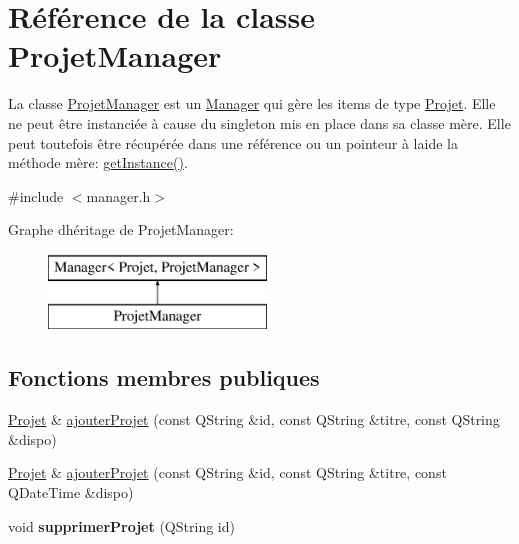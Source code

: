 \hypertarget{class_projet_manager}{}\section{Référence de la classe Projet\+Manager}
\label{class_projet_manager}


La classe \hyperlink{class_projet_manager}{Projet\+Manager} est un \hyperlink{class_manager}{Manager} qui gère les items de type \hyperlink{class_projet}{Projet}. Elle ne peut être instanciée à cause du singleton mis en place dans sa classe mère. Elle peut toutefois être récupérée dans une référence ou un pointeur à l\textquotesingle{}aide la méthode mère\+: \hyperlink{class_manager_a8372e4f1e14f3605a57d839b152325ed}{get\+Instance()}.  




{\ttfamily \#include $<$manager.\+h$>$}

Graphe d\textquotesingle{}héritage de Projet\+Manager\+:\begin{figure}[H]
\begin{center}
\leavevmode
\includegraphics[height=2.000000cm]{class_projet_manager}
\end{center}
\end{figure}
\subsection*{Fonctions membres publiques}
\begin{DoxyCompactItemize}
\item 
\hyperlink{class_projet}{Projet} \& \hyperlink{class_projet_manager_a3394d5ab0749ea68efb5ae535b27e6fc}{ajouter\+Projet} (const Q\+String \&id, const Q\+String \&titre, const Q\+String \&dispo)
\item 
\hyperlink{class_projet}{Projet} \& \hyperlink{class_projet_manager_a6da5a61e20cbf0a6bc98a3681f977829}{ajouter\+Projet} (const Q\+String \&id, const Q\+String \&titre, const Q\+Date\+Time \&dispo)
\item 
\hypertarget{class_projet_manager_a04c4b5b2c4d84f2ad48abe24d6960607}{}void {\bfseries supprimer\+Projet} (Q\+String id)\label{class_projet_manager_a04c4b5b2c4d84f2ad48abe24d6960607}

\end{DoxyCompactItemize}
